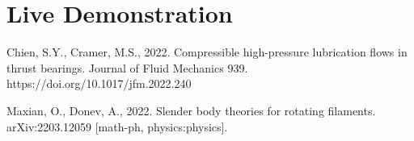 \documentclass[11pt,letterpaper]{article}
\begin{document}
\section{Live Demonstration}
\cite{ChienCramer_22, MaxianDonev_22}

Chien, S.Y., Cramer, M.S., 2022. Compressible high-pressure lubrication flows in thrust bearings. Journal of Fluid Mechanics 939. https://doi.org/10.1017/jfm.2022.240

Maxian, O., Donev, A., 2022. Slender body theories for rotating filaments. arXiv:2203.12059 [math-ph, physics:physics].




\newpage
\printbibliography
\end{document}
